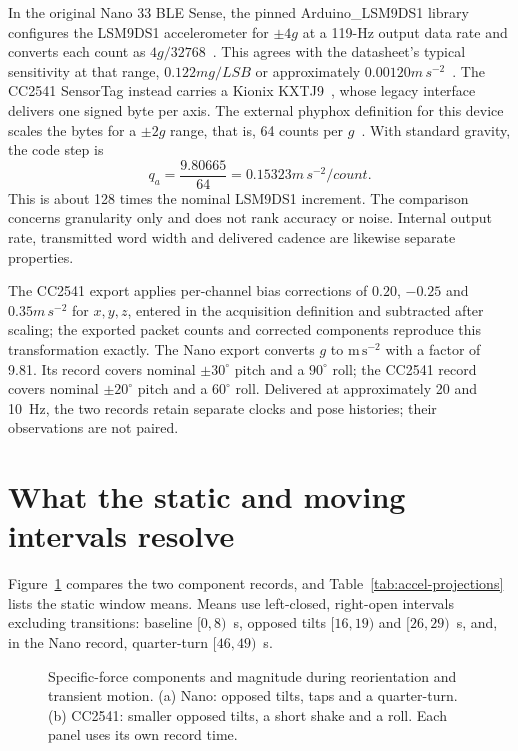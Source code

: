 In the original Nano 33 BLE Sense, the pinned Arduino\_LSM9DS1 library configures the LSM9DS1 accelerometer for $\pm4g$ at a 119-Hz output data rate and converts each count as $4g/32768$~\cite{arduinoimu}. This agrees with the datasheet's typical sensitivity at that range, $0.122\unit{mg/LSB}$ or approximately $0.00120\unit{m\,s^{-2}}$~\cite{lsm9ds1}. The CC2541 SensorTag instead carries a Kionix KXTJ9~\cite{cc2541quick}, whose legacy interface delivers one signed byte per axis. The external phyphox definition for this device scales the bytes for a $\pm2g$ range, that is, 64 counts per $g$~\cite{cc2541protocol}. With standard gravity, the code step is
\begin{equation}
 q_a=\frac{9.80665}{64}=0.15323\unit{m\,s^{-2}/count}.
 \label{eq:accel-code}
\end{equation}
This is about 128 times the nominal LSM9DS1 increment. The comparison concerns granularity only and does not rank accuracy or noise. Internal output rate, transmitted word width and delivered cadence are likewise separate properties.

The CC2541 export applies per-channel bias corrections of $0.20$, $-0.25$ and $0.35\unit{m\,s^{-2}}$ for $x,y,z$, entered in the acquisition definition and subtracted after scaling; the exported packet counts and corrected components reproduce this transformation exactly. The Nano export converts $g$ to $\mathrm{m\,s^{-2}}$ with a factor of 9.81. Its record covers nominal $\pm30^\circ$ pitch and a $90^\circ$ roll; the CC2541 record covers nominal $\pm20^\circ$ pitch and a $60^\circ$ roll. Delivered at approximately 20 and 10~Hz, the two records retain separate clocks and pose histories; their observations are not paired.

\section{What the static and moving intervals resolve}
Figure~\ref{fig:accel-examples} compares the two component records, and Table~\ref{tab:accel-projections} lists the static window means. Means use left-closed, right-open intervals excluding transitions: baseline $[0,8)$~s, opposed tilts $[16,19)$ and $[26,29)$~s, and, in the Nano record, quarter-turn $[46,49)$~s.

\begin{figure}[t]
\centering

\caption{Specific-force components and magnitude during reorientation and transient motion. (a) Nano: opposed tilts, taps and a quarter-turn. (b) CC2541: smaller opposed tilts, a short shake and a roll. Each panel uses its own record time.}
\label{fig:accel-examples}
\end{figure}

